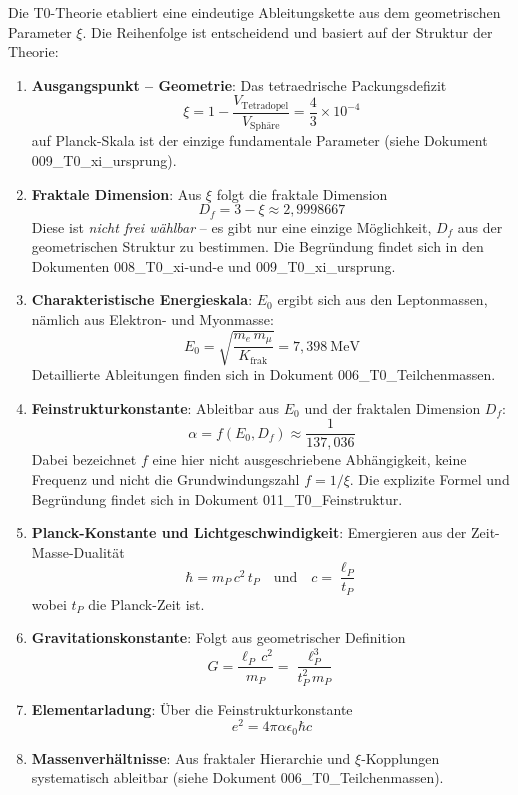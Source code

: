 	Die T0-Theorie etabliert eine eindeutige Ableitungskette aus dem geometrischen Parameter \(\xi\). Die Reihenfolge ist entscheidend und basiert auf der Struktur der Theorie:
	
	\begin{enumerate}
		\item \textbf{Ausgangspunkt -- Geometrie}: Das tetraedrische Packungsdefizit
		\[
		\xi = 1 - \frac{V_{\text{Tetradopel}}}{V_{\text{Sphäre}}} = \frac{4}{3} \times 10^{-4}
		\]
		auf Planck-Skala ist der einzige fundamentale Parameter (siehe Dokument 009\_T0\_xi\_ursprung).
		
		\item \textbf{Fraktale Dimension}: Aus \(\xi\) folgt die fraktale Dimension
		\[
		D_f = 3 - \xi \approx 2{,}9998667
		\]
		Diese ist \emph{nicht frei wählbar} -- es gibt nur eine einzige Möglichkeit, \(D_f\) aus der geometrischen Struktur zu bestimmen. Die Begründung findet sich in den Dokumenten 008\_T0\_xi-und-e und 009\_T0\_xi\_ursprung.
		
		\item \textbf{Charakteristische Energieskala}: \(E_0\) ergibt sich aus den Leptonmassen, nämlich aus Elektron- und Myonmasse:
		\[
		E_0 = \sqrt{\frac{m_e\, m_\mu}{K_{\text{frak}}}} = 7{,}398\ \text{MeV}
		\]
		Detaillierte Ableitungen finden sich in Dokument 006\_T0\_Teilchenmassen.
		
		\item \textbf{Feinstrukturkonstante}: Ableitbar aus \(E_0\) und der fraktalen Dimension \(D_f\):
		\[
		\alpha = f(E_0, D_f) \approx \frac{1}{137{,}036}
		\]
		Dabei bezeichnet $f$ eine hier nicht ausgeschriebene Abhängigkeit, keine Frequenz und nicht die Grundwindungszahl $f = 1/\xi$. Die explizite Formel und Begründung findet sich in Dokument 011\_T0\_Feinstruktur.
		
		\item \textbf{Planck-Konstante und Lichtgeschwindigkeit}: Emergieren aus der Zeit-Masse-Dualität
		\[
		\hbar = m_P \, c^2 \, t_P \quad \text{und} \quad c = \frac{\ell_P}{t_P}
		\]
		wobei \(t_P\) die Planck-Zeit ist.
		
		\item \textbf{Gravitationskonstante}: Folgt aus geometrischer Definition
		\[
		G = \frac{\ell_P \, c^2}{m_P} = \frac{\ell_P^3}{t_P^2 \, m_P}
		\]
		
		\item \textbf{Elementarladung}: Über die Feinstrukturkonstante
		\[
		e^2 = 4\pi \alpha \epsilon_0 \hbar c
		\]
		
		\item \textbf{Massenverhältnisse}: Aus fraktaler Hierarchie und \(\xi\)-Kopplungen systematisch ableitbar (siehe Dokument 006\_T0\_Teilchenmassen).
	\end{enumerate}

